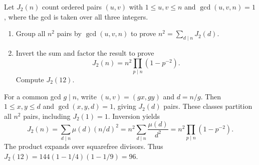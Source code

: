 Let $J_2(n)$ count ordered pairs $(u,v)$ with $1\le u,v\le n$ and
$\gcd(u,v,n)=1$, where the gcd is taken over all three integers.
\begin{enumerate}
 \item Group all $n^2$ pairs by $\gcd(u,v,n)$ to prove
 $n^2=\sum_{d\mid n}J_2(d)$. 
 \item Invert the sum and factor the result to prove
 \[
 J_2(n)=n^2\prod_{p\mid n}(1-p^{-2}).
 \]
 Compute $J_2(12)$. 
\end{enumerate}
\begin{solution}
For a common gcd $g\mid n$, write $(u,v)=(gx,gy)$ and $d=n/g$.
Then $1\le x,y\le d$ and $\gcd(x,y,d)=1$, giving $J_2(d)$ pairs.
These classes partition all $n^2$ pairs, including $J_2(1)=1$.
Inversion yields
\[
 J_2(n)=\sum_{d\mid n}\mu(d)(n/d)^2
       =n^2\sum_{d\mid n}\frac{\mu(d)}{d^2}
       =n^2\prod_{p\mid n}(1-p^{-2}).
\]
The product expands over squarefree divisors. Thus
$J_2(12)=144(1-1/4)(1-1/9)=96$.
\end{solution}

